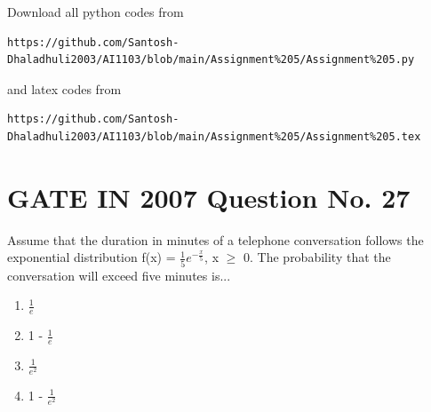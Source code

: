 \documentclass[journal,12pt,twocolumn]{IEEEtran}
\begin{document}
Download all python codes from 
\begin{lstlisting}
https://github.com/Santosh-Dhaladhuli2003/AI1103/blob/main/Assignment%205/Assignment%205.py
\end{lstlisting}
%
and latex codes from 
%
\begin{lstlisting}
https://github.com/Santosh-Dhaladhuli2003/AI1103/blob/main/Assignment%205/Assignment%205.tex
\end{lstlisting}
\section{\textbf{GATE IN 2007 Question No. 27}}
Assume that the duration in minutes of a telephone conversation follows the exponential distribution f(x) = $\frac{1}{5}e^{-\frac{x}{5}}$, x $\ge$ 0. The probability that the conversation will exceed five minutes is...

\begin{enumerate}
\item $\frac{1}{e}$ 
\item 1 - $\frac{1}{e}$ 
\item $\frac{1}{e^2}$ 
\item 1 - $\frac{1}{e^2}$
\end{enumerate}
\end{document}
